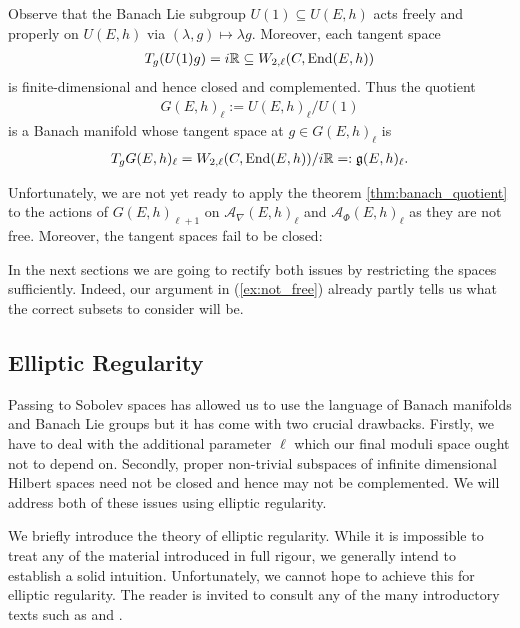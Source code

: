 \documentclass[12pt]{ociamthesis}  %
\begin{document}
\begin{example}
  Observe that the Banach Lie subgroup $U(1)\subseteq U(E,h)$ acts freely and properly
  on $U(E,h)$ via $(\lambda,g)\mapsto \lambda g$. Moreover, each tangent space
  \begin{align*}
    T_g(U(1)g) =
    i\mathbb{R} \subseteq W_{2,\ell}(C,\operatorname{End}(E,h))
  \end{align*}
  is finite-dimensional and hence closed and complemented.  Thus the quotient
  \begin{align*}
    G(E,h)_{\ell} := U(E,h)_\ell / U(1)
  \end{align*}
  is a Banach manifold whose tangent space at $g\in G(E,h)_\ell$ is
  \begin{align*}
    T_g G(E,h)_\ell =  W_{2,\ell}(C,\operatorname{End}(E,h))/i\mathbb{R} =: \mathfrak g(E,h)_\ell.
  \end{align*}
\end{example}

Unfortunately, we are not yet ready to apply the theorem \ref{thm:banach_quotient} to
the actions of $G(E,h)_{\ell+1}$ on $\mathcal A_\nabla(E,h)_\ell$ and
$\mathcal A_\Phi(E,h)_\ell$ as they are not free. Moreover, the tangent spaces fail to
be closed:

\begin{example}
  \missingexample
\end{example}

In the next sections we are going to rectify both issues by restricting the spaces
sufficiently. Indeed, our argument in (\ref{ex:not_free}) already partly tells us
what the correct subsets to consider will be.

\subsection{Elliptic Regularity}\label{sec:elliptic_regularity}

Passing to Sobolev spaces has allowed us to use the language of
Banach manifolds and Banach Lie groups but it has come with two
crucial drawbacks. Firstly, we have to deal with the additional
parameter $\ell$ which our final moduli space ought not to depend on.
Secondly, proper non-trivial subspaces of infinite dimensional Hilbert
spaces need not be closed and hence may not be complemented.
We will address both of these issues using elliptic regularity.

We briefly introduce the theory of elliptic regularity. While it is
impossible to treat any of the material introduced in full rigour,
we generally intend to establish a solid intuition. Unfortunately, we
cannot hope to achieve this for elliptic regularity. The reader is
invited to consult any of the many introductory texts such
as \cite{hance2014} and \cite[Chapter 6]{warner1983}.
\end{document}
